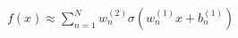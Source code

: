\documentclass[preview]{standalone}
\begin{document}
\begin{align*}
f(x) \approx  \sum_{n=1}^{N} w_n^{(2)} \sigma(w_n^{(1)}x+b_n^{(1)})
\end{align*}
\end{document}
